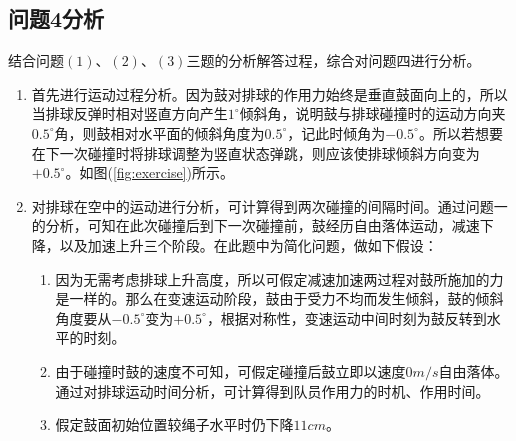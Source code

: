 \documentclass{cumcm}
\begin{document}
\subsection{问题4分析}
结合问题$(1)$、$(2)$、$(3)$三题的分析解答过程，综合对问题四进行分析。
\begin{enumerate}
\item 首先进行运动过程分析。因为鼓对排球的作用力始终是垂直鼓面向上的，所以当排球反弹时相对竖直方向产生$1^{\circ}$倾斜角，说明鼓与排球碰撞时的运动方向夹$0.5^{\circ}$角，则鼓相对水平面的倾斜角度为$0.5^{\circ}$，记此时倾角为$-0.5^{\circ}$。所以若想要在下一次碰撞时将排球调整为竖直状态弹跳，则应该使排球倾斜方向变为$+0.5^{\circ}$。如图(\ref{fig:exercise})所示。
\item 对排球在空中的运动进行分析，可计算得到两次碰撞的间隔时间。通过问题一的分析，可知在此次碰撞后到下一次碰撞前，鼓经历自由落体运动，减速下降，以及加速上升三个阶段。在此题中为简化问题，做如下假设：
\begin{enumerate}
\item 因为无需考虑排球上升高度，所以可假定减速加速两过程对鼓所施加的力是一样的。那么在变速运动阶段，鼓由于受力不均而发生倾斜，鼓的倾斜角度要从$-0.5^{\circ}$变为$+0.5^{\circ}$，根据对称性，变速运动中间时刻为鼓反转到水平的时刻。
\item 由于碰撞时鼓的速度不可知，可假定碰撞后鼓立即以速度$0m/s$自由落体。通过对排球运动时间分析，可计算得到队员作用力的时机、作用时间。
\item 假定鼓面初始位置较绳子水平时仍下降$11cm$。
\end{enumerate}


\end{enumerate}
\end{document}
